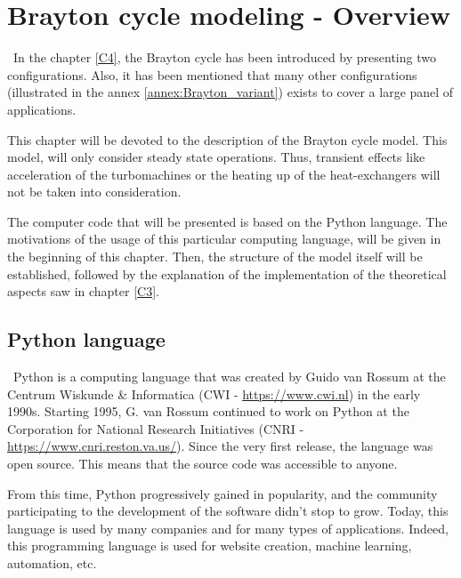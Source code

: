 \graphicspath{{Chapitre_5/Images/}}
\chapter{Brayton cycle modeling - Overview}\label{C5}
\quad\, In the chapter \ref{C4}, the Brayton cycle has been introduced by presenting two configurations. Also, it has been mentioned that many other configurations (illustrated in the annex \ref{annex:Brayton_variant}) exists to cover a large panel of applications. 

This chapter will be devoted to the description of the  Brayton cycle model. This model, will only consider steady state operations. Thus, transient effects like acceleration of the turbomachines or the heating up of the heat-exchangers will not be taken into consideration.

The computer code that will be presented is based on the Python language\citep{van1995python}. The motivations of the usage of this particular computing language, will be given in the beginning of this chapter. Then, the structure of the model itself will be established, followed by the explanation of the implementation of the theoretical aspects saw in chapter \ref{C3}.

\section{Python language}
\quad\, Python is a computing language that was created by Guido van Rossum at the Centrum Wiskunde \& Informatica (CWI - \url{https://www.cwi.nl}) in the early 1990s. Starting 1995, G. van Rossum continued to work on Python at the Corporation for National Research Initiatives (CNRI - \url{https://www.cnri.reston.va.us/}). Since the very first release, the language was open source. This means that the source code was accessible to anyone. 

From this time, Python progressively gained in popularity, and the community participating to the development of the software didn't stop to grow. Today, this language is used by many companies and for many types of applications. Indeed, this programming language is used for website creation, machine learning, automation, etc. 

